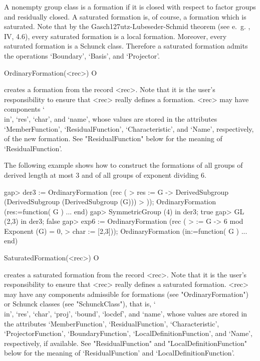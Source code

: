 \null


A nonempty group class is a  formation if it is closed with respect to factor
groups and residually closed. A saturated formation is, of course, a
formation which is saturated. Note that by the
Gasch\accent127utz-Lubeseder-Schmid theorem (see e.~g. \cite{DH92}, IV,
4.6), every saturated formation is a local formation. Moreover, every
saturated formation is a Schunck class. Therefore a saturated formation
admits the operations `Boundary', `Basis', and `Projector'.


\>OrdinaryFormation(<rec>) O

creates a formation from the record <rec>. Note that it is the user's responsibility to ensure that <rec> really
defines a formation. <rec> may have components `\\in',
`res', `char', and `name', whose values are stored in the attributes
`MemberFunction', `ResidualFunction', `Characteristic', and
`Name', respectively, of the new formation. See "ResidualFunction" below for the meaning of
`ResidualFunction'.

The following example shows how to construct the formations of all groups of 
derived length at most $3$ and of all groups of exponent dividing $6$.

\beginexample
gap> der3 := OrdinaryFormation (rec (
>    res := G -> DerivedSubgroup (DerivedSubgroup (DerivedSubgroup (G)))
> ));
OrdinaryFormation (res:=function( G ) ... end)
gap> SymmetricGroup (4) in der3;
true
gap> GL (2,3) in der3;
false
gap> exp6 := OrdinaryFormation (rec (
>    \in := G -> 6 mod Exponent (G) = 0,
>    char := [2,3]));
OrdinaryFormation (in:=function( G ) ... end)
\endexample

\>SaturatedFormation(<rec>) O

creates a saturated formation from the record <rec>. Note that it is the user's responsibility to ensure that <rec> really
defines a saturated formation. <rec> may have any
components admissible for formations (see "OrdinaryFormation") or Schunck
classes (see "SchunckClass"), that is, `\\in', `res', `char', `proj',
`bound', `locdef', and `name', 
 whose values are stored in the attributes `MemberFunction',
`ResidualFunction', `Characteristic',  `ProjectorFunction',
`BoundaryFunction', `LocalDefinitionFunction', and
`Name', respectively, if available.  See "ResidualFunction" and "LocalDefinitionFunction" below
for the meaning of `ResidualFunction' and `LocalDefinitionFunction'.

